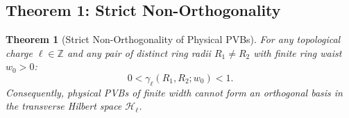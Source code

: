 \documentclass{optica-article}
\newtheorem{theorem}{Theorem}
\begin{document}
\subsection{Theorem 1: Strict Non-Orthogonality}

\begin{theorem}[Strict Non-Orthogonality of Physical PVBs]
\label{thm:non_orthogonality}
For any topological charge $\ell \in \mathbb{Z}$ and any pair of distinct ring radii $R_1 \neq R_2$ with finite ring waist $w_0 > 0$:
\begin{equation}
0 < \gamma_\ell(R_1, R_2; w_0) < 1.
\label{eq:thm1_claim}
\end{equation}
Consequently, physical PVBs of finite width cannot form an orthogonal basis in the transverse Hilbert space $\mathcal{H}_\ell$.
\end{theorem}
\end{document}
